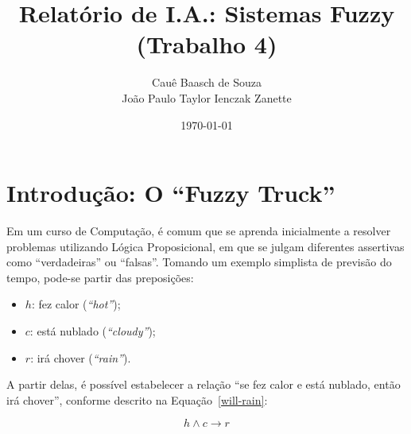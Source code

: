 \documentclass[twocolumn]{article}
\title{Relatório de I.A.: Sistemas Fuzzy (Trabalho 4)}
\author{Cauê Baasch de Souza \\
        João Paulo Taylor Ienczak Zanette}
\date{\today}
\newcommand{\todo}[1]{{\color{red}{#1}}}
\begin{document}
    \maketitle{}

    \todo{%
        TO-DO\@:
        \begin{itemize}
            \item Descrever tutorial breve de Fuzzy;
            \item Entradas;
            \item Conjuntos Fuzzy;
            \item Regras;
            \item Método de defuzzificação;
            \item Dificuldades encontradas e como foram superadas.
        \end{itemize}
    }

    \section{Introdução: O ``Fuzzy Truck''}

    Em um curso de Computação, é comum que se aprenda inicialmente a resolver
    problemas utilizando Lógica Proposicional, em que se julgam diferentes
    assertivas como ``verdadeiras'' ou ``falsas''. Tomando um exemplo simplista
    de previsão do tempo, pode-se partir das preposições:

    \begin{itemize}
        \item $h$: fez calor (\textit{``hot''});
        \item $c$: está nublado (\textit{``cloudy''});
        \item $r$: irá chover (\textit{``rain''}).
    \end{itemize}

    A partir delas, é possível estabelecer a relação ``se fez calor e está
        nublado, então irá chover'', conforme descrito na Equação~\ref{will-rain}:

    \begin{equation}
        \label{will-rain}
        h \land c \rightarrow r
    \end{equation}
\end{document}
